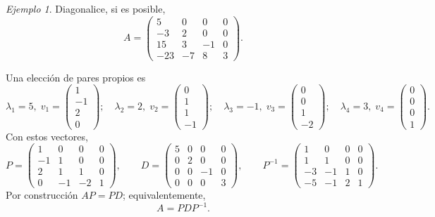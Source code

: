 \documentclass[12pt]{article}
\theoremstyle{remark}
\newtheorem{Ejem}[definicion]{Ejemplo}
\begin{document}
\begin{Ejem}

Diagonalice, si es posible,
\[
A=\begin{pmatrix}5 & 0 & 0 & 0\\-3 & 2 & 0 & 0\\15 & 3 & -1 & 0\\-23 & -7 & 8 & 3\end{pmatrix}.
\]

\scriptsize
Una elección de pares propios es
\[
\lambda_1=5,\;v_1=\begin{pmatrix}1\\-1\\2\\0\end{pmatrix};\quad \lambda_2=2,\;v_2=\begin{pmatrix}0\\1\\1\\-1\end{pmatrix};\quad \lambda_3=-1,\;v_3=\begin{pmatrix}0\\0\\1\\-2\end{pmatrix};\quad \lambda_4=3,\;v_4=\begin{pmatrix}0\\0\\0\\1\end{pmatrix}.
\]
Con estos vectores,
\[
P=\begin{pmatrix}1 & 0 & 0 & 0\\-1 & 1 & 0 & 0\\2 & 1 & 1 & 0\\0 & -1 & -2 & 1\end{pmatrix},\qquad D=\begin{pmatrix}5 & 0 & 0 & 0\\0 & 2 & 0 & 0\\0 & 0 & -1 & 0\\0 & 0 & 0 & 3\end{pmatrix},\qquad P^{-1}=\begin{pmatrix}1 & 0 & 0 & 0\\1 & 1 & 0 & 0\\-3 & -1 & 1 & 0\\-5 & -1 & 2 & 1\end{pmatrix}.
\]
Por construcción $AP=PD$; equivalentemente,
\[
\boxed{A=PDP^{-1}}.
\]
\end{Ejem}
\end{document}
